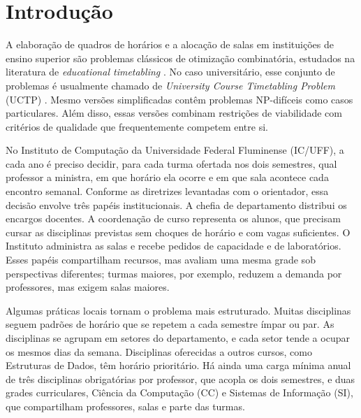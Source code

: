 \section{Introdução}
\label{sec:introducao}

A elaboração de quadros de horários e a alocação de salas em instituições de ensino superior são problemas clássicos de otimização combinatória, estudados na literatura de \textit{educational timetabling} \cite{schaerf1999survey}. No caso universitário, esse conjunto de problemas é usualmente chamado de \textit{University Course Timetabling Problem} (UCTP) \cite{lewis2008survey,babaei2015survey}. Mesmo versões simplificadas contêm problemas NP-difíceis como casos particulares. Além disso, essas versões combinam restrições de viabilidade com critérios de qualidade que frequentemente competem entre si.

No Instituto de Computação da Universidade Federal Fluminense (IC/UFF), a cada ano é preciso decidir, para cada turma ofertada nos dois semestres, qual professor a ministra, em que horário ela ocorre e em que sala acontece cada encontro semanal. Conforme as diretrizes levantadas com o orientador, essa decisão envolve três papéis institucionais. A chefia de departamento distribui os encargos docentes. A coordenação de curso representa os alunos, que precisam cursar as disciplinas previstas sem choques de horário e com vagas suficientes. O Instituto administra as salas e recebe pedidos de capacidade e de laboratórios. Esses papéis compartilham recursos, mas avaliam uma mesma grade sob perspectivas diferentes; turmas maiores, por exemplo, reduzem a demanda por professores, mas exigem salas maiores.

Algumas práticas locais tornam o problema mais estruturado. Muitas disciplinas seguem padrões de horário que se repetem a cada semestre ímpar ou par. As disciplinas se agrupam em setores do departamento, e cada setor tende a ocupar os mesmos dias da semana. Disciplinas oferecidas a outros cursos, como Estruturas de Dados, têm horário prioritário. Há ainda uma carga mínima anual de três disciplinas obrigatórias por professor, que acopla os dois semestres, e duas grades curriculares, Ciência da Computação (CC) e Sistemas de Informação (SI), que compartilham professores, salas e parte das turmas. 

